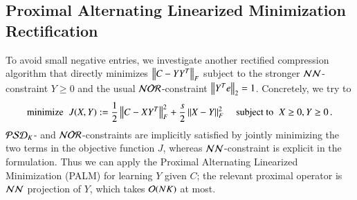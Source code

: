 \subsection{Proximal Alternating Linearized Minimization Rectification}

To avoid small negative entries, we investigate another rectified compression
algorithm that directly minimizes $\left\lVert C - Y Y^T\right\rVert_F$ subject to the stronger
$\mathcal{NN}$\hyp{}constraint $Y \geq 0$ and the usual $\mathcal{NOR}$\hyp{}constraint
$\left\lVert Y^Te\right\rVert_2 \mathrel{=} 1$. Concretely, we try to
\begin{equation}
  \text{minimize} \;\; J(X, Y) := \frac{1}{2} \left\lVert C - XY^T\right\rVert_F^2 + \frac{s}{2}
  \left\lVert X - Y\right\rVert_F^2 \;\;\;\; \text{subject to} \;\; X \geq 0, Y \geq 0\,. 
  \label{eqn:palm}
\end{equation}
$\mathcal{PSD}_K$- and $\mathcal{NOR}$-constraints are implicitly satisfied by jointly minimizing
the two terms in the objective function $J$, whereas $\mathcal{NN}$\hyp{}constraint is
explicit in the formulation. Thus we can apply the Proximal Alternating
Linearized Minimization (PALM)\cite{bolte2014proximal} for learning $Y$ given
$C$; the relevant proximal operator is $\mathcal{NN}$ projection of $Y$, which takes
$\mathcal{O}(NK)$ at most.

